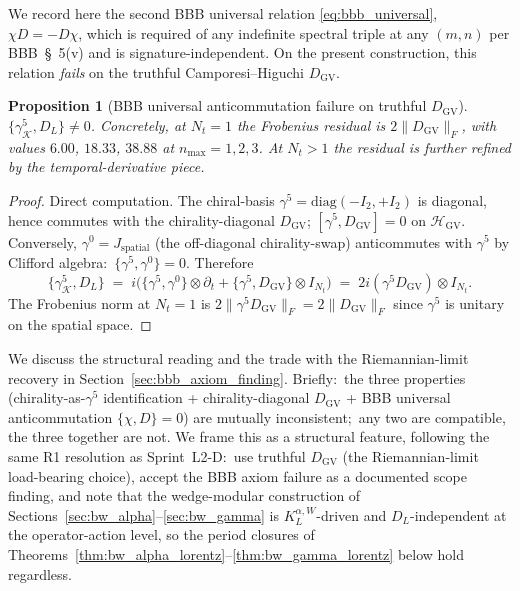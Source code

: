 \documentclass[11pt,a4paper]{article}
\theoremstyle{plain}
\newtheorem{proposition}[theorem]{Proposition}
\theoremstyle{definition}
\newcommand{\nmax}{n_{\max}}
\newcommand{\Nt}{N_t}
\newcommand{\Hilb}{\mathcal{H}}
\newcommand{\Krein}{\mathcal{K}}
\newcommand{\Frob}[1]{\lVert #1 \rVert_{F}}
\newcommand{\DGV}{D_{\mathrm{GV}}}
\newcommand{\DL}{D_{L}}
\newcommand{\KL}{K_{L}}
\begin{document}
We record here the second BBB universal relation
\eqref{eq:bbb_universal}, $\chi D = -D \chi$, which is required of any
indefinite spectral triple at any $(m, n)$ per BBB~\S~5(v) and is
signature-independent. On the present construction, this relation
\emph{fails} on the truthful Camporesi--Higuchi $\DGV$.

\begin{proposition}[BBB universal anticommutation failure on truthful $\DGV$]
\label{prop:bbb_axiom_failure}
$\{\gamma^5_{\Krein}, \DL\} \ne 0$. Concretely, at $\Nt = 1$ the
Frobenius residual is $2 \Frob{\DGV}$, with values
$6.00$, $18.33$, $38.88$ at $\nmax = 1, 2, 3$. At $\Nt > 1$ the
residual is further refined by the temporal-derivative piece.
\end{proposition}

\begin{proof}
Direct computation. The chiral-basis $\gamma^5 = \mathrm{diag}(-I_2,
+I_2)$ is diagonal, hence commutes with the chirality-diagonal $\DGV$;
$[\gamma^5, \DGV] = 0$ on $\Hilb_{\mathrm{GV}}$. Conversely, $\gamma^0 =
J_{\mathrm{spatial}}$ (the off-diagonal chirality-swap) anticommutes
with $\gamma^5$ by Clifford algebra:\ $\{\gamma^5, \gamma^0\} = 0$.
Therefore
\[
   \{\gamma^5_{\Krein}, \DL\}
   \;=\; i \bigl(\{\gamma^5, \gamma^0\} \otimes \partial_t
                + \{\gamma^5, \DGV\} \otimes I_{\Nt}\bigr)
   \;=\; 2i (\gamma^5 \DGV) \otimes I_{\Nt}.
\]
The Frobenius norm at $\Nt = 1$ is $2 \Frob{\gamma^5 \DGV} =
2 \Frob{\DGV}$ since $\gamma^5$ is unitary on the spatial space.
\end{proof}

We discuss the structural reading and the trade with the
Riemannian-limit recovery in
Section~\ref{sec:bbb_axiom_finding}. Briefly:\ the three properties
(chirality-as-$\gamma^5$ identification + chirality-diagonal $\DGV$ +
BBB universal anticommutation $\{\chi, D\} = 0$) are mutually
inconsistent;\ any two are compatible, the three together are not.
We frame this as a structural feature, following the same R1
resolution as Sprint~L2-D:\ use truthful $\DGV$ (the Riemannian-limit
load-bearing choice), accept the BBB axiom failure as a documented
scope finding, and note that the wedge-modular construction of
Sections~\ref{sec:bw_alpha}--\ref{sec:bw_gamma} is
$\KL^{\alpha, W}$-driven and $\DL$-independent at the operator-action
level, so the period closures of
Theorems~\ref{thm:bw_alpha_lorentz}--\ref{thm:bw_gamma_lorentz} below
hold regardless.

\end{document}
